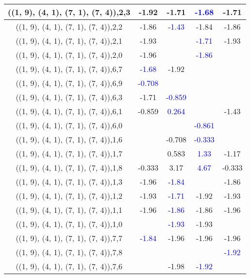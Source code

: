 \documentclass{article}
\begin{document}
\begin{center}
\begin{longtable}{|c|c|c|c|c|}
        	\hline
        	((1, 9), (4, 1), (7, 1), (7, 4)),2,3&-1.92&-1.71& \textcolor{blue}{-1.68}&-1.71\\
        	\hline
        	((1, 9), (4, 1), (7, 1), (7, 4)),2,2&-1.86& \textcolor{blue}{-1.43}&-1.84&-1.86\\
        	\hline
        	((1, 9), (4, 1), (7, 1), (7, 4)),2,1&-1.93&& \textcolor{blue}{-1.71}&-1.93\\
        	\hline
        	((1, 9), (4, 1), (7, 1), (7, 4)),2,0&-1.96&& \textcolor{blue}{-1.86}&\\
        	\hline
        	((1, 9), (4, 1), (7, 1), (7, 4)),6,7& \textcolor{blue}{-1.68}&-1.92&&\\
        	\hline
        	((1, 9), (4, 1), (7, 1), (7, 4)),6,9& \textcolor{blue}{-0.708}&&&\\
        	\hline
        	((1, 9), (4, 1), (7, 1), (7, 4)),6,3&-1.71& \textcolor{blue}{-0.859}&&\\
        	\hline
        	((1, 9), (4, 1), (7, 1), (7, 4)),6,1&-0.859& \textcolor{blue}{0.264}&&-1.43\\
        	\hline
        	((1, 9), (4, 1), (7, 1), (7, 4)),6,0&&& \textcolor{blue}{-0.861}&\\
        	\hline
        	((1, 9), (4, 1), (7, 1), (7, 4)),1,6&&-0.708& \textcolor{blue}{-0.333}&\\
        	\hline
        	((1, 9), (4, 1), (7, 1), (7, 4)),1,7&&0.583& \textcolor{blue}{1.33}&-1.17\\
        	\hline
        	((1, 9), (4, 1), (7, 1), (7, 4)),1,8&-0.333&3.17& \textcolor{blue}{4.67}&-0.333\\
        	\hline
        	((1, 9), (4, 1), (7, 1), (7, 4)),1,3&-1.96& \textcolor{blue}{-1.84}&&-1.86\\
        	\hline
        	((1, 9), (4, 1), (7, 1), (7, 4)),1,2&-1.93& \textcolor{blue}{-1.71}&-1.92&-1.93\\
        	\hline
        	((1, 9), (4, 1), (7, 1), (7, 4)),1,1&-1.96& \textcolor{blue}{-1.86}&-1.86&-1.96\\
        	\hline
        	((1, 9), (4, 1), (7, 1), (7, 4)),1,0&& \textcolor{blue}{-1.93}&-1.93&\\
        	\hline
        	((1, 9), (4, 1), (7, 1), (7, 4)),7,7& \textcolor{blue}{-1.84}&-1.96&-1.96&-1.96\\
        	\hline
        	((1, 9), (4, 1), (7, 1), (7, 4)),7,8&&&& \textcolor{blue}{-1.92}\\
        	\hline
        	((1, 9), (4, 1), (7, 1), (7, 4)),7,6&&-1.98& \textcolor{blue}{-1.92}&\\

\end{longtable}
\end{center}
\end{document}
